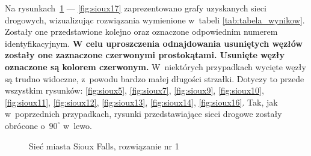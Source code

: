 \documentclass[twoside,12pt]{report}
\begin{document}
Na rysunkach~\ref{fig:sioux1} --- \ref{fig:sioux17} zaprezentowano grafy uzyskanych sieci drogowych, wizualizując rozwiązania wymienione w~tabeli \ref{tab:tabela_wynikow}. Zostały one przedstawione kolejno oraz oznaczone odpowiednim numerem identyfikacyjnym. \textbf{W celu uproszczenia odnajdowania usuniętych węzłów zostały one zaznaczone czerwonymi prostokątami. Usunięte węzły oznaczone są kolorem czerwonym.}  W~niektórych przypadkach wycięte węzły są trudno widoczne, z~powodu bardzo małej długości strzałki. Dotyczy to przede wszystkim rysunków: \ref{fig:sioux5}, \ref{fig:sioux7}, \ref{fig:sioux9}, \ref{fig:sioux10}, \ref{fig:sioux11}, \ref{fig:sioux12}, \ref{fig:sioux13}, \ref{fig:sioux14}, \ref{fig:sioux16}. Tak, jak w~poprzednich przypadkach, rysunki przedstawiające sieci drogowe zostały obrócone o~$90^{\circ}$ w~lewo. 


\begin{figure}[htbp]
\centering
{}
\caption{Sieć miasta Sioux Falls, rozwiązanie nr 1}
\label{fig:sioux1}
\end{figure}
\end{document}
